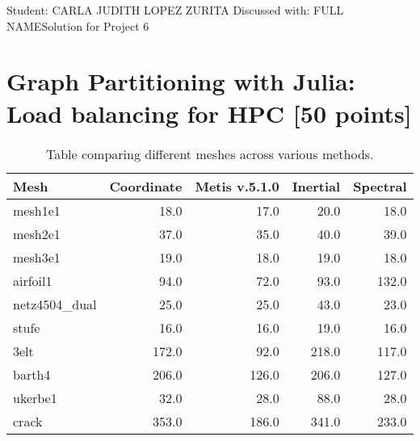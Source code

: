 \documentclass[unicode,11pt,a4paper,oneside,numbers=endperiod,openany]{scrartcl}
\begin{document}
\setassignment
{}

            {Student: CARLA JUDITH LOPEZ ZURITA}
            {Discussed with: FULL NAME}{Solution for Project 6}{}
\newline

\section{Graph Partitioning with Julia: Load balancing for HPC [50 points]}

\begin{table}[h!]
    \centering
    \begin{tabular}{|l|r|r|r|r|}
    \hline
    \textbf{Mesh} & \textbf{Coordinate} & \textbf{Metis v.5.1.0} & \textbf{Inertial} & \textbf{Spectral} \\ \hline
    mesh1e1 & 18.0 & 17.0 & 20.0 & 18.0 \\ \hline
    mesh2e1 & 37.0 & 35.0 & 40.0 & 39.0 \\ \hline
    mesh3e1 & 19.0 & 18.0 & 19.0 & 18.0 \\ \hline
    airfoil1 & 94.0 & 72.0 & 93.0 & 132.0 \\ \hline
    netz4504\_dual & 25.0 & 25.0 & 43.0 & 23.0 \\ \hline
    stufe & 16.0 & 16.0 & 19.0 & 16.0 \\ \hline
    3elt & 172.0 & 92.0 & 218.0 & 117.0 \\ \hline
    barth4 & 206.0 & 126.0 & 206.0 & 127.0 \\ \hline
    ukerbe1 & 32.0 & 28.0 & 88.0 & 28.0 \\ \hline
    crack & 353.0 & 186.0 & 341.0 & 233.0 \\ \hline
    \end{tabular}
    \caption{Table comparing different meshes across various methods.}
\end{table}
    
\end{document}
